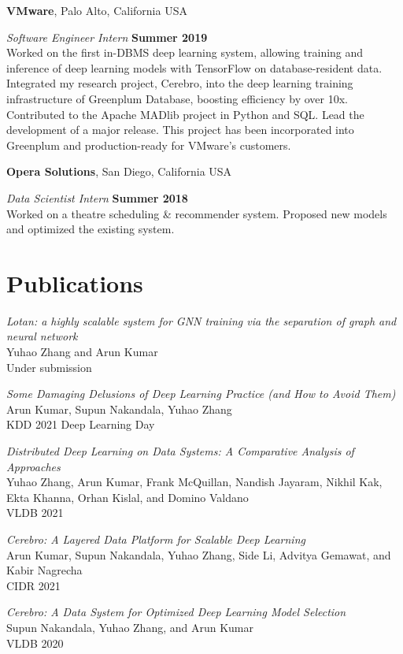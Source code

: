 \documentclass[margin,line]{res}
\begin{document}
\begin{resume}
{\bf VMware}, Palo Alto, California USA

\vspace{-.3cm}
{\em Software Engineer Intern} \hfill {\bf Summer 2019}\\
Worked on the first in-DBMS deep learning system, allowing training and inference of deep learning models with TensorFlow on database-resident data. Integrated my research project, Cerebro, into the deep learning training infrastructure of Greenplum Database, boosting efficiency by over 10x. Contributed to the Apache MADlib project in Python and SQL. Lead the development of a major release. This project has been incorporated into Greenplum and production-ready for VMware's customers.

{\bf Opera Solutions}, San Diego, California USA

\vspace{-.3cm}
{\em Data Scientist Intern} \hfill {\bf Summer 2018}\\
Worked on a theatre scheduling \& recommender system. Proposed new models and optimized the existing system.

\section{\sc Publications}
\textit{Lotan: a highly scalable system for GNN training via the separation of graph and neural network}\\
Yuhao Zhang and Arun Kumar\\
Under submission


\textit{Some Damaging Delusions of Deep Learning Practice (and How to Avoid Them)}\\
Arun Kumar, Supun Nakandala, Yuhao Zhang\\
KDD 2021 Deep Learning Day

\textit{Distributed Deep Learning on Data Systems: A Comparative Analysis of Approaches}\\
Yuhao Zhang, Arun Kumar, Frank McQuillan, Nandish Jayaram, Nikhil Kak, Ekta Khanna, Orhan Kislal, and Domino Valdano\\
VLDB 2021

\textit{Cerebro: A Layered Data Platform for Scalable Deep Learning}\\
Arun Kumar, Supun Nakandala, Yuhao Zhang, Side Li, Advitya Gemawat, and Kabir Nagrecha\\
CIDR 2021

\textit{Cerebro: A Data System for Optimized Deep Learning Model Selection}\\
Supun Nakandala, Yuhao Zhang, and Arun Kumar\\
VLDB 2020


\end{resume}
\end{document}
